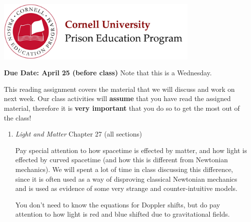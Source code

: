 \documentclass[addpoints,12pt]{exam}
\begin{document}

\begin{flushright}
\vspace{0.2in}

\end{flushright}

\begin{center}
\includegraphics[width=10cm]{../images/logo.png}
\end{center}

\begin{center}
\end{center}

\noindent\begin{large}\textbf{Due Date: April 25 (before class)} Note that this is a Wednesday.\end{large}
\vspace{0.2in}

This reading assignment covers the material that we will discuss and work on next week. Our class activities will \textbf{assume} that you have read the assigned material, therefore it is \textbf{very important} that you do so to get the most out of the class!

\begin{enumerate}


	\item \textit{Light and Matter} Chapter 27 (all sections)
	
	Pay special attention to how spacetime is effected by matter, and how light is effected by curved spacetime (and how this is different from Newtonian mechanics). We will spent a lot of time in class discussing this difference, since it is often used as a way of disproving classical Newtonian mechanics and is used as evidence of some very strange and counter-intuitive models.
	
	You don't need to know the equations for Doppler shifts, but do pay attention to how light is red and blue shifted due to gravitational fields.	

	
\end{enumerate}
\end{document}

